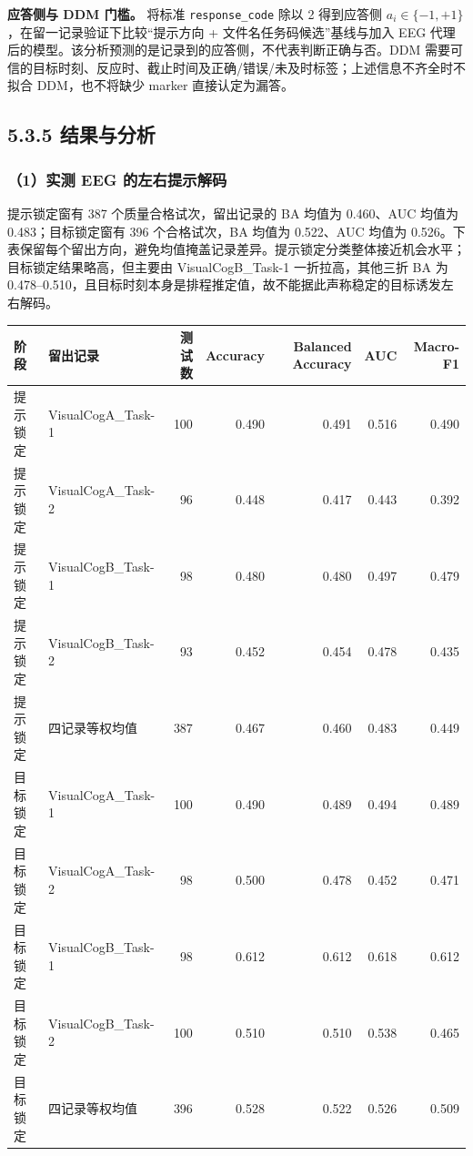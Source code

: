 \documentclass[
]{article}
\begin{document}
\textbf{应答侧与 DDM 门槛。} 将标准 \texttt{response\_code} 除以 2
得到应答侧 \(a_i\in\{-1,+1\}\)，在留一记录验证下比较``提示方向 +
文件名任务码候选''基线与加入 EEG
代理后的模型。该分析预测的是记录到的应答侧，不代表判断正确与否。DDM
需要可信的目标时刻、反应时、截止时间及正确/错误/未及时标签；上述信息不齐全时不拟合
DDM，也不将缺少 marker 直接认定为漏答。

\hypertarget{ux7ed3ux679cux4e0eux5206ux6790}{%
\subsection{5.3.5 结果与分析}\label{ux7ed3ux679cux4e0eux5206ux6790}}

\hypertarget{ux5b9eux6d4b-eeg-ux7684ux5de6ux53f3ux63d0ux793aux89e3ux7801}{%
\subsubsection{（1）实测 EEG
的左右提示解码}\label{ux5b9eux6d4b-eeg-ux7684ux5de6ux53f3ux63d0ux793aux89e3ux7801}}

提示锁定窗有 387 个质量合格试次，留出记录的 BA 均值为 0.460、AUC 均值为
0.483；目标锁定窗有 396 个合格试次，BA 均值为 0.522、AUC 均值为
0.526。下表保留每个留出方向，避免均值掩盖记录差异。提示锁定分类整体接近机会水平；目标锁定结果略高，但主要由
VisualCogB\_Task-1 一折拉高，其他三折 BA 为
0.478--0.510，且目标时刻本身是排程推定值，故不能据此声称稳定的目标诱发左右解码。

\begin{longtable}[]{@{}llrrrrr@{}}
\toprule
阶段 & 留出记录 & 测试数 & Accuracy & Balanced Accuracy & AUC &
Macro-F1 \\
\midrule
\endhead
提示锁定 & VisualCogA\_Task-1 & 100 & 0.490 & 0.491 & 0.516 & 0.490 \\
提示锁定 & VisualCogA\_Task-2 & 96 & 0.448 & 0.417 & 0.443 & 0.392 \\
提示锁定 & VisualCogB\_Task-1 & 98 & 0.480 & 0.480 & 0.497 & 0.479 \\
提示锁定 & VisualCogB\_Task-2 & 93 & 0.452 & 0.454 & 0.478 & 0.435 \\
提示锁定 & 四记录等权均值 & 387 & 0.467 & 0.460 & 0.483 & 0.449 \\
目标锁定 & VisualCogA\_Task-1 & 100 & 0.490 & 0.489 & 0.494 & 0.489 \\
目标锁定 & VisualCogA\_Task-2 & 98 & 0.500 & 0.478 & 0.452 & 0.471 \\
目标锁定 & VisualCogB\_Task-1 & 98 & 0.612 & 0.612 & 0.618 & 0.612 \\
目标锁定 & VisualCogB\_Task-2 & 100 & 0.510 & 0.510 & 0.538 & 0.465 \\
目标锁定 & 四记录等权均值 & 396 & 0.528 & 0.522 & 0.526 & 0.509 \\
\bottomrule
\end{longtable}
\end{document}

